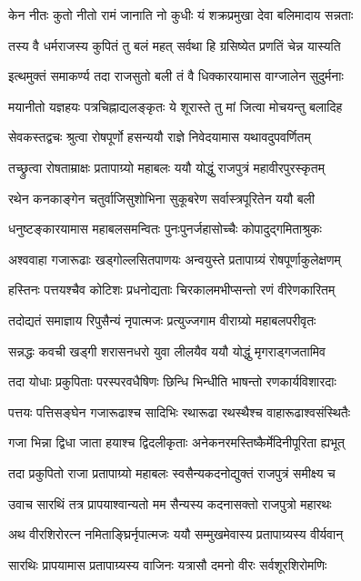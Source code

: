 \twolineshloka
{केन नीतः कुतो नीतो रामं जानाति नो कुधीः}
{यं शक्रप्रमुखा देवा बलिमादाय सन्नताः}%

\twolineshloka
{तस्य वै धर्मराजस्य कुपितं तु बलं महत्}
{सर्वथा हि ग्रसिष्येत प्रणतिं चेन्न यास्यति}%

\twolineshloka
{इत्थमुक्तं समाकर्ण्य तदा राजसुतो बली}
{तं वै धिक्कारयामास वाग्जालेन सुदुर्मनाः}%

\twolineshloka
{मयानीतो यज्ञहयः पत्रचिह्नाद्यलङ्कृतः}
{ये शूरास्ते तु मां जित्वा मोचयन्तु बलादिह}%

\twolineshloka
{सेवकस्तद्वचः श्रुत्वा रोषपूर्णो हसन्ययौ}
{राज्ञे निवेदयामास यथावदुपवर्णितम्}%

\twolineshloka
{तच्छ्रुत्वा रोषताम्राक्षः प्रतापाग्र्यो महाबलः}
{ययौ योद्धुं राजपुत्रं महावीरपुरस्कृतम्}%

\twolineshloka
{रथेन कनकाङ्गेन चतुर्वाजिसुशोभिना}
{सुकूबरेण सर्वास्त्रपूरितेन ययौ बली}%

\twolineshloka
{धनुष्टङ्कारयामास महाबलसमन्वितः}
{पुनःपुनर्जहासोच्चैः कोपादुद्गमिताश्रुकः}%

\twolineshloka
{अश्ववाहा गजारूढाः खड्गोल्लसितपाणयः}
{अन्वयुस्ते प्रतापाग्र्यं रोषपूर्णाकुलेक्षणम्}%

\twolineshloka
{हस्तिनः पत्तयश्चैव कोटिशः प्रधनोद्यताः}
{चिरकालमभीप्सन्तो रणं वीरेणकारितम्}%

\twolineshloka
{तदोद्यतं समाज्ञाय रिपुसैन्यं नृपात्मजः}
{प्रत्युज्जगाम वीराग्र्यो महाबलपरीवृतः}%

\twolineshloka
{सन्नद्धः कवची खड्गी शरासनधरो युवा}
{लीलयैव ययौ योद्धुं मृगराड्गजतामिव}%

\twolineshloka
{तदा योधाः प्रकुपिताः परस्परवधैषिणः}
{छिन्धि भिन्धीति भाषन्तो रणकार्यविशारदाः}%

\twolineshloka
{पत्तयः पत्तिसङ्घेन गजारूढाश्च सादिभिः}
{रथारूढा रथस्थैश्च वाहारूढाश्वसंस्थितैः}%

\twolineshloka
{गजा भिन्ना द्विधा जाता हयाश्च द्विदलीकृताः}
{अनेकनरमस्तिष्कैर्मेदिनीपूरिता ह्यभूत्}%

\twolineshloka
{तदा प्रकुपितो राजा प्रतापाग्र्यो महाबलः}
{स्वसैन्यकदनोद्युक्तं राजपुत्रं समीक्ष्य च}%

\twolineshloka
{उवाच सारथिं तत्र प्रापयाश्वान्यतो मम}
{सैन्यस्य कदनासक्तो राजपुत्रो महारथः}%

\twolineshloka
{अथ वीरशिरोरत्न नमिताङ्घ्रिर्नृपात्मजः}
{ययौ सम्मुखमेवास्य प्रतापाग्र्यस्य वीर्यवान्}%

\twolineshloka
{सारथिः प्रापयामास प्रतापाग्र्यस्य वाजिनः}
{यत्रासौ दमनो वीरः सर्वशूरशिरोमणिः}%

